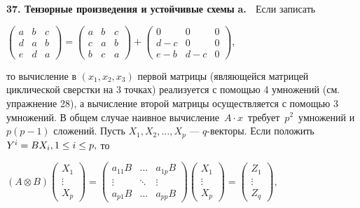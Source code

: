 \documentclass{../../template/mai_book}
\begin{document}
\textbf{37. Тензорные произведения и устойчивые схемы} \newline \newline \indent
\textbf{a.} $\;$ Если записать 
\begin{center}
$\begin{pmatrix}
a & b & c \\
d & a & b \\         
e & d & a
\end{pmatrix} = \begin{pmatrix}
a & b & c \\
c & a & b \\         
b & c & a
\end{pmatrix} + \begin{pmatrix}
0 & 0 & 0 \\
d - c & 0 & 0 \\         
e - b &d - c & 0
\end{pmatrix},$
\end{center}
то вычисление в $(x_1 , x_2 , x_3)$ первой матрицы (являющейся матрицей циклической сверстки на 3 точках) реализуется с помощью 4 умножений	
\newpage
\noindent
(см. упражнение 28), а вычисление второй матрицы осуществляется с помощью 3 умножений. \newline \newline \indent
В общем случае наивное вычисление $\, A \cdot x \,$ требует $\, p^2 \,$ умножений и $p(p - 1)$ сложений. Пусть $X_1 , X_2 , \dots , X_p$ --- $q$-векторы. Если положить $Y^i = BX_i, \, \\ 1 \le i \le p,$ то \newline
\begin{center}
$(A \otimes B) \begin{pmatrix}
X_1 \\
\vdots \\
X_p
\end{pmatrix} = \begin{pmatrix}
a_{11}B & \dots & a_{1p}B \\
\vdots & \ddots & \vdots \\
a_{p1}B & \dots & a_{pp}B
\end{pmatrix} \begin{pmatrix}
X_1 \\
\vdots \\
X_p
\end{pmatrix} = \begin{pmatrix}
Z_1 \\
\vdots \\
Z_q
\end{pmatrix},$
\end{center}
\end{document}
